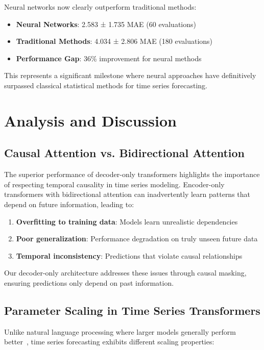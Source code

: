 \documentclass[11pt]{article}
\begin{document}
Neural networks now clearly outperform traditional methods:
\begin{itemize}
\item \textbf{Neural Networks}: 2.583 ± 1.735 MAE (60 evaluations)
\item \textbf{Traditional Methods}: 4.034 ± 2.806 MAE (180 evaluations)
\item \textbf{Performance Gap}: 36\% improvement for neural methods
\end{itemize}

This represents a significant milestone where neural approaches have definitively surpassed classical statistical methods for time series forecasting.

\section{Analysis and Discussion}

\subsection{Causal Attention vs. Bidirectional Attention}

The superior performance of decoder-only transformers highlights the importance of respecting temporal causality in time series modeling. Encoder-only transformers with bidirectional attention can inadvertently learn patterns that depend on future information, leading to:

\begin{enumerate}
\item \textbf{Overfitting to training data}: Models learn unrealistic dependencies
\item \textbf{Poor generalization}: Performance degradation on truly unseen future data
\item \textbf{Temporal inconsistency}: Predictions that violate causal relationships
\end{enumerate}

Our decoder-only architecture addresses these issues through causal masking, ensuring predictions only depend on past information.

\subsection{Parameter Scaling in Time Series Transformers}

Unlike natural language processing where larger models generally perform better~\cite{radford2019language,brown2020language}, time series forecasting exhibits different scaling properties:
\end{document}
